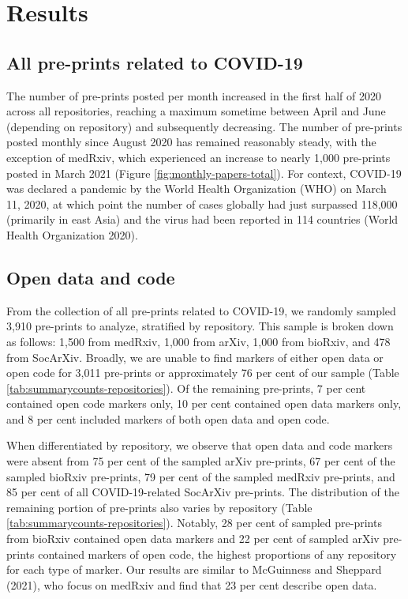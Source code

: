 \documentclass[
]{article}
\begin{document}
\hypertarget{results}{%
\section{Results}\label{results}}

\hypertarget{all-pre-prints-related-to-covid-19}{%
\subsection{All pre-prints related to COVID-19}\label{all-pre-prints-related-to-covid-19}}

The number of pre-prints posted per month increased in the first half of 2020 across all repositories, reaching a maximum sometime between April and June (depending on repository) and subsequently decreasing. The number of pre-prints posted monthly since August 2020 has remained reasonably steady, with the exception of medRxiv, which experienced an increase to nearly 1,000 pre-prints posted in March 2021 (Figure \ref{fig:monthly-papers-total}). For context, COVID-19 was declared a pandemic by the World Health Organization (WHO) on March 11, 2020, at which point the number of cases globally had just surpassed 118,000 (primarily in east Asia) and the virus had been reported in 114 countries (World Health Organization 2020).

\hypertarget{open-data-and-code}{%
\subsection{Open data and code}\label{open-data-and-code}}

From the collection of all pre-prints related to COVID-19, we randomly sampled 3,910 pre-prints to analyze, stratified by repository. This sample is broken down as follows: 1,500 from medRxiv, 1,000 from arXiv, 1,000 from bioRxiv, and 478 from SocArXiv. Broadly, we are unable to find markers of either open data or open code for 3,011 pre-prints or approximately 76 per cent of our sample (Table \ref{tab:summarycounts-repositories}). Of the remaining pre-prints, 7 per cent contained open code markers only, 10 per cent contained open data markers only, and 8 per cent included markers of both open data and open code.

When differentiated by repository, we observe that open data and code markers were absent from 75 per cent of the sampled arXiv pre-prints, 67 per cent of the sampled bioRxiv pre-prints, 79 per cent of the sampled medRxiv pre-prints, and 85 per cent of all COVID-19-related SocArXiv pre-prints. The distribution of the remaining portion of pre-prints also varies by repository (Table \ref{tab:summarycounts-repositories}). Notably, 28 per cent of sampled pre-prints from bioRxiv contained open data markers and 22 per cent of sampled arXiv pre-prints contained markers of open code, the highest proportions of any repository for each type of marker. Our results are similar to McGuinness and Sheppard (2021), who focus on medRxiv and find that 23 per cent describe open data.
\end{document}
